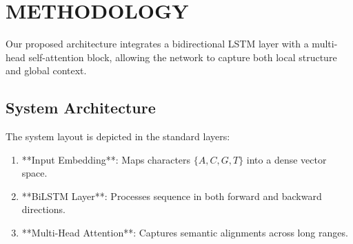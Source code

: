 \chapter{METHODOLOGY}
\label{ch:methodology}

Our proposed architecture integrates a bidirectional LSTM layer with a multi-head self-attention block, allowing the network to capture both local structure and global context.

\section{System Architecture}
The system layout is depicted in the standard layers:
\begin{enumerate}
    \item **Input Embedding**: Maps characters $\{A, C, G, T\}$ into a dense vector space.
    \item **BiLSTM Layer**: Processes sequence in both forward and backward directions.
    \item **Multi-Head Attention**: Captures semantic alignments across long ranges.
\end{enumerate}
